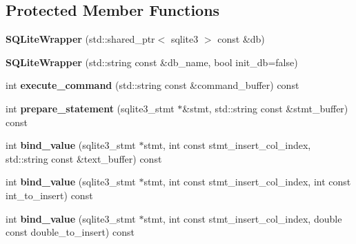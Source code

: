 \subsection*{Protected Member Functions}
\begin{DoxyCompactItemize}
\item 
\mbox{\label{class_s_q_lite_wrapper_a9a61e968f7a892ddb9383fa8db001705}} 
{\bfseries S\+Q\+Lite\+Wrapper} (std\+::shared\+\_\+ptr$<$ sqlite3 $>$ const \&db)
\item 
\mbox{\label{class_s_q_lite_wrapper_ae1fce784c6c43a9deea31f68fc2e9966}} 
{\bfseries S\+Q\+Lite\+Wrapper} (std\+::string const \&db\+\_\+name, bool init\+\_\+db=false)
\item 
\mbox{\label{class_s_q_lite_wrapper_affeef069fe57f5340b64cd5dd41a5b51}} 
int {\bfseries execute\+\_\+command} (std\+::string const \&command\+\_\+buffer) const
\item 
\mbox{\label{class_s_q_lite_wrapper_a8635a805eb0012f6ef97335e003d740f}} 
int {\bfseries prepare\+\_\+statement} (sqlite3\+\_\+stmt $\ast$\&stmt, std\+::string const \&stmt\+\_\+buffer) const
\item 
\mbox{\label{class_s_q_lite_wrapper_a8cbdaf79201aabb1a70208cd1264b004}} 
int {\bfseries bind\+\_\+value} (sqlite3\+\_\+stmt $\ast$stmt, int const stmt\+\_\+insert\+\_\+col\+\_\+index, std\+::string const \&text\+\_\+buffer) const
\item 
\mbox{\label{class_s_q_lite_wrapper_a3dd12d5bcf5c795ed14d38835b24c8f5}} 
int {\bfseries bind\+\_\+value} (sqlite3\+\_\+stmt $\ast$stmt, int const stmt\+\_\+insert\+\_\+col\+\_\+index, int const int\+\_\+to\+\_\+insert) const
\item 
\mbox{\label{class_s_q_lite_wrapper_ad76118f495723394edf380cf70e0e381}} 
int {\bfseries bind\+\_\+value} (sqlite3\+\_\+stmt $\ast$stmt, int const stmt\+\_\+insert\+\_\+col\+\_\+index, double const double\+\_\+to\+\_\+insert) const
\item 
\mbox{\label{class_s_q_lite_wrapper_a3bfa48072fccfb0ab7591f240b468112}} 

\end{DoxyCompactItemize}
